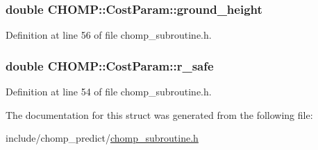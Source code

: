 \subsubsection[{\texorpdfstring{ground\+\_\+height}{ground_height}}]{\setlength{\rightskip}{0pt plus 5cm}double C\+H\+O\+M\+P\+::\+Cost\+Param\+::ground\+\_\+height}\hypertarget{struct_c_h_o_m_p_1_1_cost_param_afdb481a80ee8ef47dc837075993f0821}{}\label{struct_c_h_o_m_p_1_1_cost_param_afdb481a80ee8ef47dc837075993f0821}


Definition at line 56 of file chomp\+\_\+subroutine.\+h.

\subsubsection[{\texorpdfstring{r\+\_\+safe}{r_safe}}]{\setlength{\rightskip}{0pt plus 5cm}double C\+H\+O\+M\+P\+::\+Cost\+Param\+::r\+\_\+safe}\hypertarget{struct_c_h_o_m_p_1_1_cost_param_a9ab5a375539e209151d57dea31b4eed9}{}\label{struct_c_h_o_m_p_1_1_cost_param_a9ab5a375539e209151d57dea31b4eed9}


Definition at line 54 of file chomp\+\_\+subroutine.\+h.



The documentation for this struct was generated from the following file\+:\begin{DoxyCompactItemize}
\item 
include/chomp\+\_\+predict/\hyperlink{chomp__subroutine_8h}{chomp\+\_\+subroutine.\+h}\end{DoxyCompactItemize}
